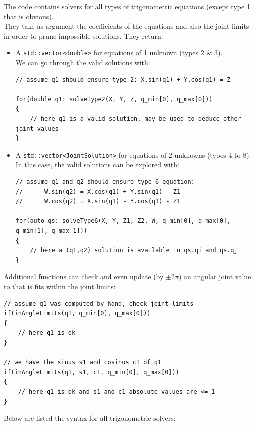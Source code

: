 \documentclass{ecnreport}
\begin{document}
The code contains solvers for all types of trigonometric equations (except type 1 that is obvious).\\
They take as argument the coefficients of the equations and also the joint limits in order to prune impossible solutions. They return:
\begin{itemize}
	\item A \texttt{std::vector<double>} for equations of 1 unknown (types 2 \& 3).\\We can go through the valid solutions with:
\cppstyle
	\begin{lstlisting}
// assume q1 should ensure type 2: X.sin(q1) + Y.cos(q1) = Z

for(double q1: solveType2(X, Y, Z, q_min[0], q_max[0]))
{
	// here q1 is a valid solution, may be used to deduce other joint values
}
	\end{lstlisting}
	\item A \texttt{std::vector<JointSolution>} for equations of 2 unknowns (types 4 to 8).\\In this case, the valid solutions can be explored with:
	\cppstyle
	\begin{lstlisting}
// assume q1 and q2 should ensure type 6 equation: 
//		W.sin(q2) = X.cos(q1) + Y.sin(q1) - Z1
//		W.cos(q2) = X.sin(q1) - Y.cos(q1) - Z1

for(auto qs: solveType6(X, Y, Z1, Z2, W, q_min[0], q_max[0], q_min[1], q_max[1]))
{
	// here a (q1,q2) solution is available in qs.qi and qs.qj
}
	\end{lstlisting}
\end{itemize}

Additional functions can check and even update (by $\pm 2\pi$) an angular joint value to that is fits within the joint limits:
\cppstyle
\begin{lstlisting}
// assume q1 was computed by hand, check joint limits
if(inAngleLimits(q1, q_min[0], q_max[0]))
{
	// here q1 is ok
}

// we have the sinus s1 and cosinus c1 of q1
if(inAngleLimits(q1, s1, c1, q_min[0], q_max[0]))
{
	// here q1 is ok and s1 and c1 absolute values are <= 1
}
\end{lstlisting}

\newpage
Below are listed the syntax for all trigonometric solvers:\\
\end{document}
